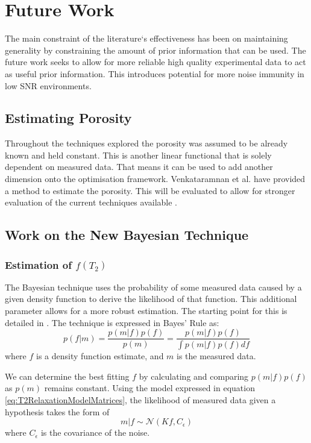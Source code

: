 \chapter{Future Work}\label{C:prog}
The main constraint of the literature`s effectiveness has been on maintaining generality by constraining the amount of prior information that can be used. The future work seeks to allow for more reliable high quality experimental data to act as useful prior information. This introduces potential for more noise immunity in low SNR environments.

\section{Estimating Porosity}
Throughout the techniques explored the porosity was assumed to be already known and held constant. This is another linear functional that is solely dependent on measured data. That means it can be used to add another dimension onto the optimisation framework. Venkataramnan et al. have provided a method to estimate the porosity. This will be evaluated to allow for stronger evaluation of the current techniques available \cite{venkataramanan2015newPorosity}.

\section{Work on the New Bayesian Technique}
\subsection{Estimation of $f(T_2)$}
The Bayesian technique uses the probability of some measured data caused by a given density function to derive the likelihood of that function. This additional parameter allows for a more robust estimation. The starting point for this is detailed in \cite{paulTeal_NMRBayes}. The technique is expressed in Bayes' Rule as:
\begin{equation}
    p(f|m) = \frac{p(m|f)p(f)}{p(m)} = \frac{p(m|f)p(f)}{\int p(m|f)p(f) df}
    \label{eq:bayesMethod}
\end{equation}
where $f$ is a density function estimate, and $m$ is the measured data.

We can determine the best fitting $f$ by calculating and comparing $p(m|f)p(f)$ as $p(m)$ remains constant. Using the model expressed in equation \ref{eq:T2RelaxationModelMatrices}, the likelihood of measured data given a hypothesis takes the form of
\begin{equation}
    m|f \sim \mathcal{N}(Kf, C_\epsilon)
\end{equation}
where $C_\epsilon$ is the covariance of the noise.

